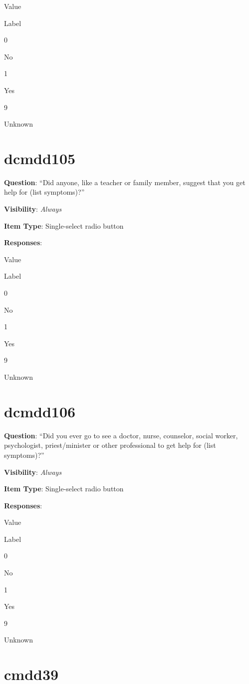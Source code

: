 \documentclass[
]{book}
\begin{document}
Value

Label

0

No

1

Yes

9

Unknown

\hypertarget{dcmdd105}{%
\section{dcmdd105}\label{dcmdd105}}

\textbf{Question}: ``Did anyone, like a teacher or family member, suggest that you get help for (list symptoms)?''

\textbf{Visibility}: \emph{Always}

\textbf{Item Type}: Single-select radio button

\textbf{Responses}:

Value

Label

0

No

1

Yes

9

Unknown

\hypertarget{dcmdd106}{%
\section{dcmdd106}\label{dcmdd106}}

\textbf{Question}: ``Did you ever go to see a doctor, nurse, counselor, social worker, psychologist, priest/minister or other professional to get help for (list symptoms)?''

\textbf{Visibility}: \emph{Always}

\textbf{Item Type}: Single-select radio button

\textbf{Responses}:

Value

Label

0

No

1

Yes

9

Unknown

\hypertarget{cmdd39}{%
\section{cmdd39}\label{cmdd39}}
\end{document}
